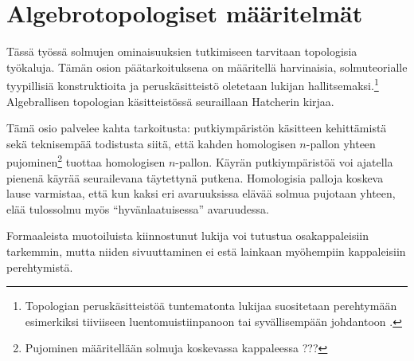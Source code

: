 \section{Algebrotopologiset määritelmät}

Tässä työssä solmujen ominaisuuksien tutkimiseen tarvitaan topologisia työkaluja. Tämän osion päätarkoituksena on määritellä harvinaisia, solmuteorialle tyypillisiä konstruktioita ja peruskäsitteistö oletetaan lukijan hallitsemaksi.\footnote{Topologian peruskäsitteistöä tuntematonta lukijaa suositetaan perehtymään esimerkiksi tiiviiseen luentomuistiinpanoon \citep{koski2024topology} tai syvällisempään johdantoon \citep{Munkres2000}.} Algebrallisen topologian käsitteistössä seuraillaan Hatcherin \citep{Hatcher2002} kirjaa.

Tämä osio palvelee kahta tarkoitusta: putkiympäristön käsitteen kehittämistä sekä teknisempää todistusta siitä, että kahden homologisen $n$-pallon yhteen pujominen\footnote{Pujominen määritellään solmuja koskevassa kappaleessa ???} tuottaa homologisen $n$-pallon. Käyrän putkiympäristöä voi ajatella pienenä käyrää seurailevana täytettynä putkena. Homologisia palloja koskeva lause varmistaa, että kun kaksi eri avaruuksissa elävää solmua pujotaan yhteen, elää tulossolmu myös ``hyvänlaatuisessa'' avaruudessa.

Formaaleista muotoiluista kiinnostunut lukija voi tutustua osakappaleisiin tarkemmin, mutta niiden sivuuttaminen ei estä lainkaan myöhempiin kappaleisiin perehtymistä.
